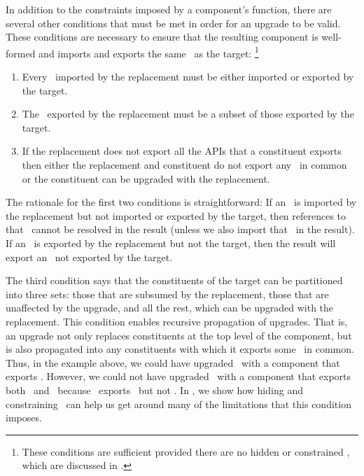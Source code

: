 In addition to the constraints
imposed by a component's  function,
there are several other conditions
that must be met in order for an upgrade to be valid.
These conditions are necessary to ensure
that the resulting component is well-formed
and imports and exports the same \apisN\ as the target:
\footnote{
  These
  conditions are sufficient
  provided there are no hidden or constrained \apisN,
  which are discussed in .
}
\begin{enumerate}

\item
Every \apiN\ imported by the replacement must be either
imported or exported by the target.

\item
The \apisN\ exported by the replacement
must be a subset of those exported by the target.

\item
If the replacement does not export all the APIs that a constituent exports
then either the replacement and constituent do not export any \apisN\ in common
or the constituent can be upgraded with the replacement.

\end{enumerate}

The rationale for the first two conditions is straightforward:
If an \apiN\ is imported by the replacement
but not imported or exported by the target,
then references to that \apiN\ cannot be resolved in the result
(unless we also import that \apiN\ in the result).
If an \apiN\ is exported by the replacement but not the target,
then the result will export an \apiN\ not exported by the target.

The third condition says that the constituents of the target
can be partitioned into three sets:
those that are subsumed by the replacement,
those that are unaffected by the upgrade,
and all the rest, which can be upgraded with the replacement.
This condition enables recursive propagation of upgrades.
That is, an upgrade not only replaces constituents
at the top level of the component,
but is also propagated into any constituents
with which it exports some \apisN\ in common.
Thus, in the example above,
we could have upgraded \coolcrypto\
with a component that exports \fortio.
However,
we could not have upgraded \coolcrypto\
with a component that exports both \fortsec\ and \fortio\
because \ironlink\ exports \fortio\ but not \fortsec.
In \secref{advancedops},
we show how hiding and constraining \apisN\ can help us
get around many of the limitations that this condition imposes.

